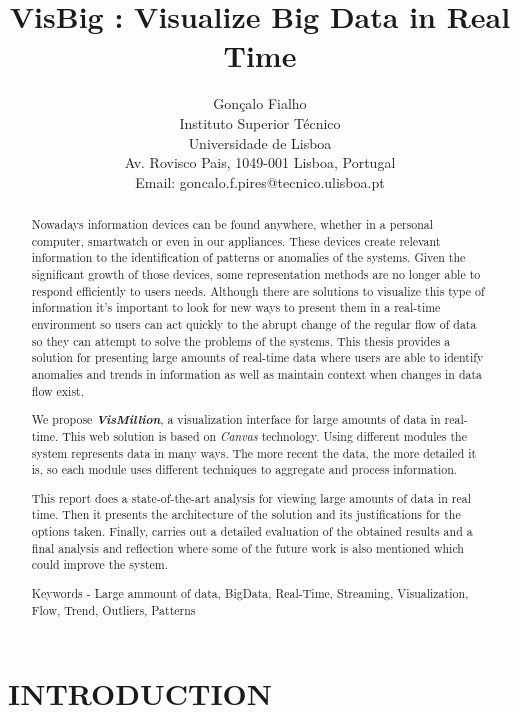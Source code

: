 \documentclass[letterpaper, 10 pt, conference]{ieeeconf}  %
\title{\LARGE \bf
VisBig : Visualize Big Data in Real Time
}
\author{Gonçalo Fialho \\ 
        Instituto Superior Técnico \\
        Universidade de Lisboa \\ 
        Av. Rovisco Pais, 1049-001 Lisboa, Portugal \\
        Email: goncalo.f.pires@tecnico.ulisboa.pt }
\begin{document}
\maketitle
\thispagestyle{plain}
\pagestyle{plain}


\begin{abstract}

Nowadays information devices can be found anywhere, whether in a personal computer, smartwatch or even in our appliances. These devices create relevant information to the identification of patterns or anomalies of the systems. Given the significant growth of those devices, some representation methods are no longer able to respond efficiently to users needs. Although there are solutions to visualize this type of information it's important to look for new ways to present them in a real-time environment so users can act quickly to the abrupt change of the regular flow of data so they can attempt to solve the problems of the systems. This thesis provides a solution for presenting large amounts of real-time data where users are able to identify anomalies and trends in information as well as maintain context when changes in data flow exist.

We propose \textit{\textbf{VisMillion}}, a visualization interface for large amounts of data in real-time. This web solution is based on \textit{Canvas} technology. Using different modules the system represents data in many ways. The more recent the data, the more detailed it is, so each module uses different techniques to aggregate and process information. 

This report does a state-of-the-art analysis for viewing large amounts of data in real time. Then it presents the architecture of the solution and its justifications for the options taken. Finally, carries out a detailed evaluation of the obtained results and a final analysis and reflection where some of the future work is also mentioned which could improve the system.

Keywords -  Large ammount of data, BigData, Real-Time, Streaming, Visualization, Flow, Trend, Outliers, Patterns

\end{abstract}


\section{INTRODUCTION}
\end{document}
